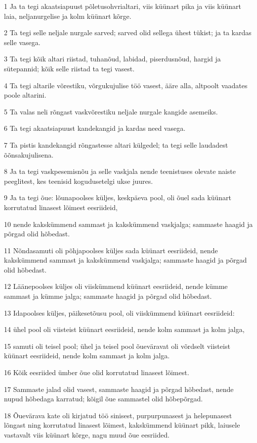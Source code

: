 \par 1 Ja ta tegi akaatsiapuust põletusohvrialtari, viis küünart pika ja viis küünart laia, neljanurgelise ja kolm küünart kõrge.
\par 2 Ta tegi selle neljale nurgale sarved; sarved olid sellega ühest tükist; ja ta kardas selle vasega.
\par 3 Ta tegi kõik altari riistad, tuhanõud, labidad, piserdusnõud, hargid ja sütepannid; kõik selle riistad ta tegi vasest.
\par 4 Ta tegi altarile võrestiku, võrgukujulise töö vasest, ääre alla, altpoolt vaadates poole altarini.
\par 5 Ta valas neli rõngast vaskvõrestiku neljale nurgale kangide asemeiks.
\par 6 Ta tegi akaatsiapuust kandekangid ja kardas need vasega.
\par 7 Ta pistis kandekangid rõngastesse altari külgedel; ta tegi selle laudadest õõnsakujulisena.
\par 8 Ja ta tegi vaskpesemisnõu ja selle vaskjala nende teenistuses olevate naiste peeglitest, kes teenisid kogudusetelgi ukse juures.
\par 9 Ja ta tegi õue: lõunapoolses küljes, keskpäeva pool, oli õuel sada küünart korrutatud linasest lõimest eesriideid,
\par 10 nende kakskümmend sammast ja kakskümmend vaskjalga; sammaste haagid ja põrgad olid hõbedast.
\par 11 Nõndasamuti oli põhjapoolses küljes sada küünart eesriideid, nende kakskümmend sammast ja kakskümmend vaskjalga; sammaste haagid ja põrgad olid hõbedast.
\par 12 Läänepoolses küljes oli viiskümmend küünart eesriideid, nende kümme sammast ja kümme jalga; sammaste haagid ja põrgad olid hõbedast.
\par 13 Idapoolses küljes, päikesetõusu pool, oli viiskümmend küünart eesriideid:
\par 14 ühel pool oli viisteist küünart eesriideid, nende kolm sammast ja kolm jalga,
\par 15 samuti oli teisel pool; ühel ja teisel pool õueväravat oli võrdselt viisteist küünart eesriideid, nende kolm sammast ja kolm jalga.
\par 16 Kõik eesriided ümber õue olid korrutatud linasest lõimest.
\par 17 Sammaste jalad olid vasest, sammaste haagid ja põrgad hõbedast, nende nupud hõbedaga karratud; kõigil õue sammastel olid hõbepõrgad.
\par 18 Õuevärava kate oli kirjatud töö sinisest, purpurpunasest ja helepunasest lõngast ning korrutatud linasest lõimest, kakskümmend küünart pikk, laiusele vastavalt viis küünart kõrge, nagu muud õue eesriided.

